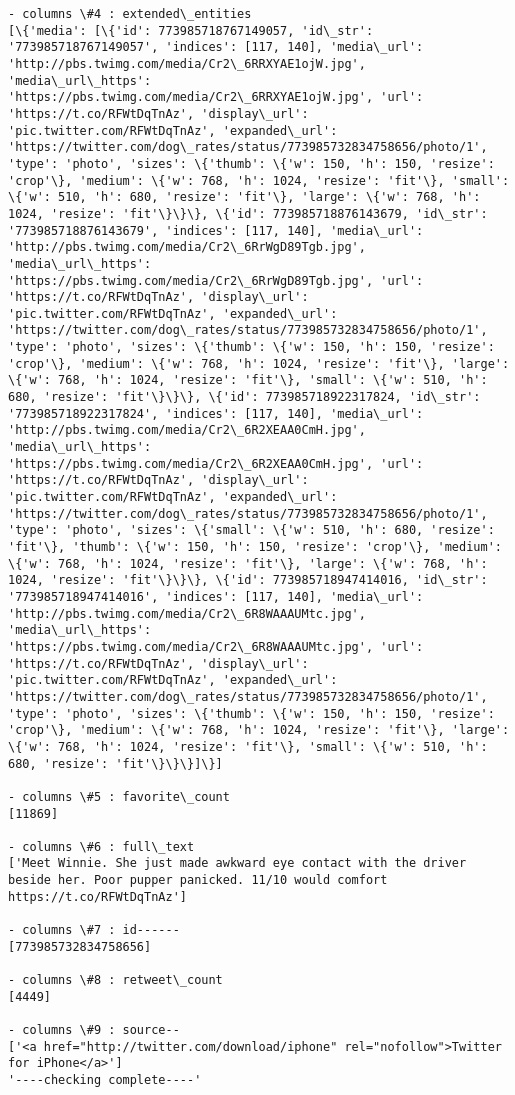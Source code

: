 \documentclass[11pt]{article}
\begin{document}
\begin{Verbatim}[commandchars=\\\{\}]
- columns \#4 : extended\_entities
[\{'media': [\{'id': 773985718767149057, 'id\_str': '773985718767149057', 'indices': [117, 140], 'media\_url': 'http://pbs.twimg.com/media/Cr2\_6RRXYAE1ojW.jpg', 'media\_url\_https': 'https://pbs.twimg.com/media/Cr2\_6RRXYAE1ojW.jpg', 'url': 'https://t.co/RFWtDqTnAz', 'display\_url': 'pic.twitter.com/RFWtDqTnAz', 'expanded\_url': 'https://twitter.com/dog\_rates/status/773985732834758656/photo/1', 'type': 'photo', 'sizes': \{'thumb': \{'w': 150, 'h': 150, 'resize': 'crop'\}, 'medium': \{'w': 768, 'h': 1024, 'resize': 'fit'\}, 'small': \{'w': 510, 'h': 680, 'resize': 'fit'\}, 'large': \{'w': 768, 'h': 1024, 'resize': 'fit'\}\}\}, \{'id': 773985718876143679, 'id\_str': '773985718876143679', 'indices': [117, 140], 'media\_url': 'http://pbs.twimg.com/media/Cr2\_6RrWgD89Tgb.jpg', 'media\_url\_https': 'https://pbs.twimg.com/media/Cr2\_6RrWgD89Tgb.jpg', 'url': 'https://t.co/RFWtDqTnAz', 'display\_url': 'pic.twitter.com/RFWtDqTnAz', 'expanded\_url': 'https://twitter.com/dog\_rates/status/773985732834758656/photo/1', 'type': 'photo', 'sizes': \{'thumb': \{'w': 150, 'h': 150, 'resize': 'crop'\}, 'medium': \{'w': 768, 'h': 1024, 'resize': 'fit'\}, 'large': \{'w': 768, 'h': 1024, 'resize': 'fit'\}, 'small': \{'w': 510, 'h': 680, 'resize': 'fit'\}\}\}, \{'id': 773985718922317824, 'id\_str': '773985718922317824', 'indices': [117, 140], 'media\_url': 'http://pbs.twimg.com/media/Cr2\_6R2XEAA0CmH.jpg', 'media\_url\_https': 'https://pbs.twimg.com/media/Cr2\_6R2XEAA0CmH.jpg', 'url': 'https://t.co/RFWtDqTnAz', 'display\_url': 'pic.twitter.com/RFWtDqTnAz', 'expanded\_url': 'https://twitter.com/dog\_rates/status/773985732834758656/photo/1', 'type': 'photo', 'sizes': \{'small': \{'w': 510, 'h': 680, 'resize': 'fit'\}, 'thumb': \{'w': 150, 'h': 150, 'resize': 'crop'\}, 'medium': \{'w': 768, 'h': 1024, 'resize': 'fit'\}, 'large': \{'w': 768, 'h': 1024, 'resize': 'fit'\}\}\}, \{'id': 773985718947414016, 'id\_str': '773985718947414016', 'indices': [117, 140], 'media\_url': 'http://pbs.twimg.com/media/Cr2\_6R8WAAAUMtc.jpg', 'media\_url\_https': 'https://pbs.twimg.com/media/Cr2\_6R8WAAAUMtc.jpg', 'url': 'https://t.co/RFWtDqTnAz', 'display\_url': 'pic.twitter.com/RFWtDqTnAz', 'expanded\_url': 'https://twitter.com/dog\_rates/status/773985732834758656/photo/1', 'type': 'photo', 'sizes': \{'thumb': \{'w': 150, 'h': 150, 'resize': 'crop'\}, 'medium': \{'w': 768, 'h': 1024, 'resize': 'fit'\}, 'large': \{'w': 768, 'h': 1024, 'resize': 'fit'\}, 'small': \{'w': 510, 'h': 680, 'resize': 'fit'\}\}\}]\}]

- columns \#5 : favorite\_count
[11869]

- columns \#6 : full\_text
['Meet Winnie. She just made awkward eye contact with the driver beside her. Poor pupper panicked. 11/10 would comfort https://t.co/RFWtDqTnAz']

- columns \#7 : id------
[773985732834758656]

- columns \#8 : retweet\_count
[4449]

- columns \#9 : source--
['<a href="http://twitter.com/download/iphone" rel="nofollow">Twitter for iPhone</a>']
'----checking complete----'

    \end{Verbatim}
\end{document}
